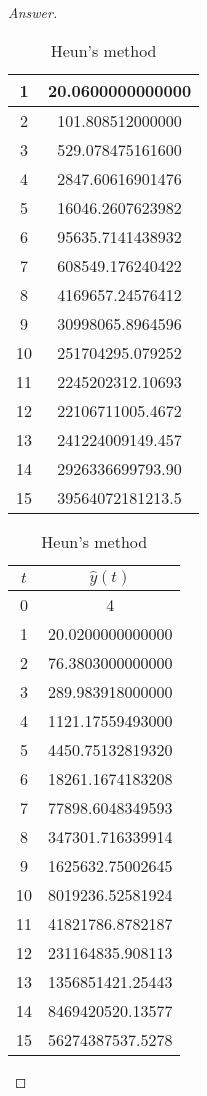 \begin{proof}[Answer]
\begin{table}[H]
\begin{table}[htbp]
\begin{subtable}[t]{0.32\textwidth}
\begin{tabular}[t]{|c|c|}
		1	&	20.0600000000000	\\	\hline
		2	&	101.808512000000	\\	\hline
		3	&	529.078475161600	\\	\hline
		4	&	2847.60616901476	\\	\hline
		5	&	16046.2607623982	\\	\hline
		6	&	95635.7141438932	\\	\hline
		7	&	608549.176240422	\\	\hline
		8	&	4169657.24576412	\\	\hline
		9	&	30998065.8964596	\\	\hline
		10	&	251704295.079252	\\	\hline
		11	&	2245202312.10693	\\	\hline
		12	&	22106711005.4672	\\	\hline
		13	&	241224009149.457	\\	\hline
		14	&	2926336699793.90	\\	\hline
		15	&	39564072181213.5	\\	\hline
		\end{tabular}
		\caption{Heun's method}
	\end{subtable}
	\begin{subtable}[t]{0.32\textwidth}
		\centering
		\begin{tabular}[t]{|c|c|}
		\hline
		\(t\)	&	\(\hat{y}(t)\)	\\	\hline
		0	&	4					\\	\hline
		1	&	20.0200000000000	\\	\hline
		2	&	76.3803000000000	\\	\hline
		3	&	289.983918000000	\\	\hline
		4	&	1121.17559493000	\\	\hline
		5	&	4450.75132819320	\\	\hline
		6	&	18261.1674183208	\\	\hline
		7	&	77898.6048349593	\\	\hline
		8	&	347301.716339914	\\	\hline
		9	&	1625632.75002645	\\	\hline
		10	&	8019236.52581924	\\	\hline
		11	&	41821786.8782187	\\	\hline
		12	&	231164835.908113	\\	\hline
		13	&	1356851421.25443	\\	\hline
		14	&	8469420520.13577	\\	\hline
		15	&	56274387537.5278	\\	\hline

\end{tabular}
\end{subtable}
\end{table}
\end{table}
\end{proof}
